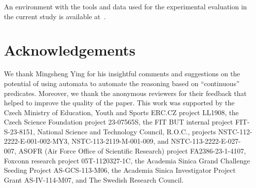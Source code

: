 An environment with the tools and data used for the experimental evaluation in
the current study is available at~\cite{artifact}.

\vspace{-0.0mm}
\section*{Acknowledgements}\label{sec:label}
\vspace{-0.0mm}

We thank Mingsheng Ying for his insightful comments and suggestions on the
potential of using automata to automate the reasoning based on ``continuous''
predicates.
Moreover, we thank the anonymous reviewers for their feedback that helped to improve the quality of the paper.
This work was supported by 
the Czech Ministry of Education, Youth and Sports ERC.CZ project LL1908,
the Czech Science Foundation project 23-07565S,
the FIT BUT internal project FIT-S-23-8151, 
National Science and Technology Council, R.O.C., projects
NSTC-112-2222-E-001-002-MY3, NSTC-113-2119-M-001-009, and
NSTC-113-2222-E-027-007, ASOFR (Air Force Office of Scientific Research) project FA2386-23-1-4107, 
Foxconn research project 05T-1120327-1C,
the Academia Sinica Grand Challenge Seeding Project AS-GCS-113-M06, the Academia Sinica Investigator Project Grant AS-IV-114-M07, and
The Swedish Research Council.






\ifTR
\newpage 
\appendix


\fi


